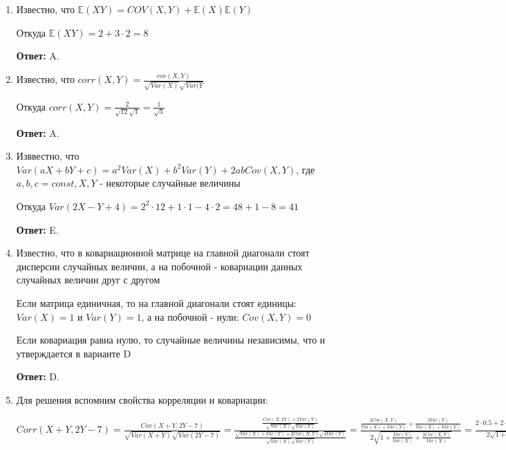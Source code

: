 \documentclass[a4paper]{article} %
\begin{document}
\begin{enumerate}
    \item
    Известно, что $\mathbb{E}(XY) = COV(X,Y) + \mathbb{E}(X)\mathbb{E}(Y)$
    
    Откуда $\mathbb{E}(XY) = 2 + 3\cdot2 = 8$
    
    \textbf{Ответ:} A.
    
    
    
    
    \item 
    Известно, что $corr(X,Y) = \frac{cov(X,Y)}{\sqrt{Var(X)}\sqrt{Var(Y}}$
    
    Откуда $corr(X,Y) = \frac{2}{\sqrt{12}\sqrt{1}} = \frac{1}{\sqrt{3}}$
    
    \textbf{Ответ:} A.
    
    
    
    
    
    \item
    Изввестно, что $Var(aX + bY + c) = a^2 Var(X) + b^2 Var(Y) + 2abCov(X,Y)$, где $a, b, c = const, X, Y$ - некоторые случайные величины
    
    Откуда $Var(2X - Y + 4) = 2^2 \cdot 12 + 1 \cdot 1 - 4 \cdot 2 = 48 + 1 - 8 = 41$
    
    \textbf{Ответ:} E.
    
    
    
    \item
    Известно, что в ковариационной матрице на главной диагонали стоят дисперсии случайных величин, а на побочной - ковариации данных случайных величин друг с другом
    
    Если матрица единичная, то на главной диагонали стоят единицы: $Var(X) = 1$ и $Var(Y) = 1$, а на побочной - нули:  $Cov(X,Y) = 0$
    
    Если ковариация равна нулю, то случайные величины независимы, что и утверждается в варианте D
    
    \textbf{Ответ:} D.
    
    
    
    
    
    \item
    Для решения вспомним свойства корреляции и ковариации:
    
    $Corr(X+Y, 2Y-7) = \frac{Cov(X+Y, 2Y-7)}{\sqrt{Var(X+Y)}\sqrt{Var(2Y-7)}} = \frac{\frac{Cov(X, 2Y) + 2 Var(Y)}{\sqrt{Var(X)}\sqrt{Var(Y)}}}{\frac{\sqrt{Var(X) + Var(Y) + 2Cov(X,Y)}\sqrt{4Var(Y)}}{\sqrt{Var(X)}\sqrt{Var(Y)}}} = \frac{\frac{2 Cov(X, Y)}{Var(X) + Var(Y)} + \frac{2 Var(Y)}{Var(X) + Var(Y)}}{2\sqrt{1 + \frac{Var(Y)}{Var(X)} + \frac{2Cov(X,Y)}{Var(X)}}} = \frac{2 \cdot 0.5 + 2 \cdot \sqrt{\frac{Var(Y)}{Var(Y)}}}{2\sqrt{1 + 1 + 1}} = \frac{1 + 2}{2 \sqrt{3}} = \frac{\sqrt{3}}{2}$
    

\end{enumerate}
\end{document}
